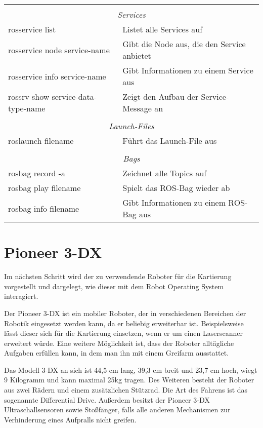 \begin{table}[b]
\begin{footnotesize}
\begin{tabular}{l l}
    \multicolumn{2}{l}{}\\
    \multicolumn{2}{c}{\textit{Services}}\\
    rosservice list & Listet alle Services auf\\
    rosservice node service-name & Gibt die Node aus, die den Service anbietet\\
    rosservice info service-name & Gibt Informationen zu einem Service aus\\
    rossrv show service-data-type-name & Zeigt den Aufbau der Service-Message an\\
    \multicolumn{2}{l}{}\\
    \multicolumn{2}{c}{\textit{Launch-Files}}\\
    roslaunch filename & Führt das Launch-File aus\\
    \multicolumn{2}{l}{}\\
    \multicolumn{2}{c}{\textit{Bags}}\\
    rosbag record -a & Zeichnet alle Topics auf\\
    rosbag play filename & Spielt das ROS-Bag wieder ab\\
    rosbag info filename & Gibt Informationen zu einem ROS-Bag aus\\
    \bottomrule
    \end{tabular}
  \end{footnotesize}
  \rmfamily
\end{table}

\section{Pioneer 3-DX}

Im nächsten Schritt wird der zu verwendende Roboter für die Kartierung vorgestellt und dargelegt, wie dieser mit dem Robot Operating System interagiert.

Der Pioneer 3-DX ist ein mobiler Roboter, der in verschiedenen Bereichen der Robotik eingesetzt werden kann, da er beliebig erweiterbar ist. Beispielsweise lässt dieser sich für die Kartierung einsetzen, wenn er um einen Laserscanner erweitert würde. Eine weitere Möglichkeit ist, dass der Roboter alltägliche Aufgaben erfüllen kann, in dem man ihn mit einem Greifarm ausstattet.

Das Modell 3-DX an sich ist 44,5 cm lang, 39,3 cm breit und 23,7 cm hoch, wiegt 9 Kilogramm und kann maximal 25kg tragen. Des Weiteren besteht der Roboter aus zwei Rädern und einem zusätzlichen Stützrad. Die Art des Fahrens ist das sogenannte Differential Drive. Außerdem besitzt der Pioneer 3-DX Ultraschallsensoren sowie Stoßfänger, falls alle anderen Mechanismen zur Verhinderung eines Aufpralls nicht greifen. \autocite{pioneer3operationsmanual}

